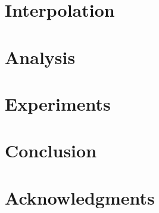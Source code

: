 \documentclass[journal]{IEEEtran}
\begin{document}
  \section{Interpolation} 
  

  \section{Analysis} 
  

  \section{Experiments} 
  

  \section{Conclusion} 
  

  \section*{Acknowledgments}
  

  \linespread{0.95}
  \begingroup
    
    
  \endgroup
\end{document}
